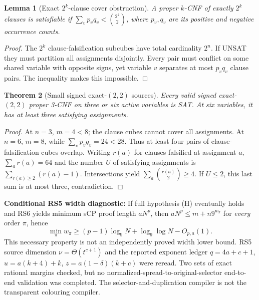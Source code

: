 \documentclass[11pt]{article}
\newtheorem{theorem}{Theorem}
\newtheorem{lemma}[theorem]{Lemma}
\begin{document}
\begin{lemma}[Exact $2^k$-clause cover obstruction]
A proper $k$-CNF of exactly $2^k$ clauses is satisfiable if $\sum_v p_vq_v<\binom{2^k}{2}$, where $p_v,q_v$ are its positive and negative occurrence counts.
\end{lemma}
\begin{proof}
The $2^k$ clause-falsification subcubes have total cardinality $2^n$. If UNSAT they must partition all assignments disjointly. Every pair must conflict on some shared variable with opposite signs, yet variable $v$ separates at most $p_vq_v$ clause pairs. The inequality makes this impossible.
\end{proof}
\begin{theorem}[Small signed exact-$(2,2)$ sources]
Every valid signed exact-$(2,2)$ proper 3-CNF on three or six active variables is SAT. At six variables, it has at least three satisfying assignments.
\end{theorem}
\begin{proof}
At $n=3$, $m=4<8$; the clause cubes cannot cover all assignments. At $n=6$, $m=8$, while $\sum_vp_vq_v=24<28$. Thus at least four pairs of clause-falsification cubes overlap. Writing $r(a)$ for clauses falsified at assignment $a$, $\sum_a r(a)=64$ and the number $U$ of satisfying assignments is $\sum_{r(a)\ge2}(r(a)-1)$. Intersections yield $\sum_a\binom{r(a)}2\ge4$. If $U\le2$, this last sum is at most three, contradiction.
\end{proof}
\noindent\textbf{Conditional RS5 width diagnostic:} If full hypothesis (H) eventually holds and RS6 yields minimum sCP proof length $aN^p$, then $aN^p\le m+n9^{w_\pi}$ for \emph{every} order $\pi$, hence
\[
\min_\pi w_\pi\ge(p-1)\log_9N+\log_9\log N-O_{p,a}(1).
\]
This necessary property is not an independently proved width lower bound. RS5 source dimension $\nu=\Theta(t^{c+1})$ and the reported exponent ledger $q=4a+c+1$, $u=a(k+4)+k$, $z=a(1-\delta)(k+c)$ were reread. Two sets of exact rational margins checked, but no normalized-spread-to-original-selector end-to-end validation was completed. The selector-and-duplication compiler is not the transparent colouring compiler.
\end{document}
